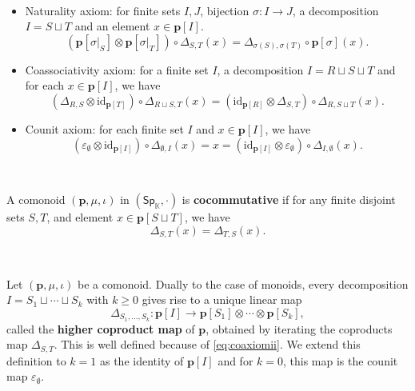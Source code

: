 \documentclass[12pt, reqno]{amsart}
\theoremstyle{definition}
\newcommand{\Ssk}{\mathsf{Sp}_\Kb} %
\newcommand{\Kb}{\mathbb{K}}
\newcommand{\tp}{\mathbf{p}}
\begin{document}
\

\begin{itemize}
    \item[(i)] Naturality axiom: for finite sets $I, J$, bijection $\sigma: I \to J$, a decomposition $I = S \sqcup T$ and an element $x\in \tp [I]$.
\begin{equation*}
(\tp[\sigma|_S] \otimes \tp[\sigma|_T])\circ\Delta_{S,T}(x)=\Delta_{\sigma(S), \sigma(T)} \circ\tp[\sigma](x).
\end{equation*}

\item[(ii)] Coassociativity axiom: for a finite set $I$, a decomposition $I=R \sqcup S \sqcup T$ and for each $x \in \tp[I]$, we have
\begin{equation}\label{eq:coaxiomii}
    (\Delta_{R,S}\otimes \text{id}_{\tp[T]})\circ \Delta_{R \sqcup S, T}(x)=(\text{id}_{\tp[R]} \otimes \Delta_{S,T})\circ \Delta_{R, S \sqcup T}(x).
\end{equation}
\vspace{.1in}
\item[(iii)] Counit axiom: for each finite set $I$ and $x \in \tp[I]$, we have
\begin{equation*}
(\varepsilon_\emptyset \otimes \text{id}_{\tp[I]})\circ\Delta_{\emptyset, I}(x)= x = (\text{id}_{\tp[I]} \otimes \varepsilon_\emptyset)\circ\Delta_{I,\emptyset}(x).
\end{equation*}

\end{itemize}


\

A comonoid $(\tp, \mu, \iota)$ in $(\Ssk, \cdot)$ is {\bf cocommutative} if for any finite disjoint sets $S, T$, and element $x\in \tp[S\sqcup T]$, we have
\begin{equation*}
    \Delta_{S,T}(x)=\Delta_{T,S}(x).
\end{equation*}

\

Let $(\tp, \mu, \iota)$ be a comonoid. Dually to the case of monoids, every decomposition $I=S_1 \sqcup \cdots \sqcup S_k$ with $k \geq 0$ gives rise to a unique linear map
\begin{equation}
    \Delta_{S_1, \hdots, S_k}: \tp[I] \to \tp[S_1]\otimes \cdots \otimes \tp[S_k],
\end{equation}
called the {\bf higher coproduct map} of $\tp$, obtained by iterating the coproducts map $\Delta_{S,T}$. 
This is well defined because of \cref{eq:coaxiomii}.
We extend this definition to $k=1$ as the identity of $\tp[I]$ and for $k=0$, this map is the counit map $\varepsilon_\emptyset$.
\end{document}
